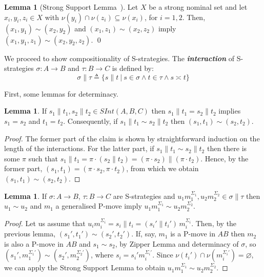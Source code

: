\documentclass{CSML}
\theoremstyle{definition}\newtheorem{definition}[thm]{Definition}
\theoremstyle{definition}\newtheorem{example}[thm]{Example}
\theoremstyle{definition}\newtheorem{proposition}[thm]{Proposition}
\theoremstyle{definition}\newtheorem{lemma}[thm]{Lemma}
\theoremstyle{definition}\newtheorem{theorem}[thm]{Theorem}
\theoremstyle{definition}\newtheorem{corollary}[thm]{Corollary}
\theoremstyle{definition}\newtheorem{remark}[thm]{Remark}
\newcommand\nt[1]{#1}
\renewcommand\Sigma{\varSigma}
\newcommand\defn{\triangleq}
\newcommand\arr{\rightarrow}
\newcommand\iseq{\mathop{\|}}
\newcommand\Sinter[1]{\mathit{SInt}(#1)}
\newcommand\boldemph[1]{\emph{\textbf{#1}}}
\begin{document}
\begin{lemma}[Strong Support Lemma~\cite{Tze09}]
Let $X$ be a strong nominal set and let $x_i,y_i,z_i\in X$ with $\nu(y_i)\cap\nu(z_i)\subseteq\nu(x_i)$, for $i=1,2$.
Then, $(x_1,y_1)\sim(x_2,y_2)$ and $(x_1,z_1)\sim(x_2,z_2)$ imply $(x_1,y_1,z_1)\sim(x_2,y_2,z_2)$. \qed
\end{lemma}


We proceed to show compositionality of S-strategies. The \boldemph{interaction} of S-strategies $\sigma:A\arr B$ and $\tau:B\arr C$ is defined by:
\[ \sigma\iseq\tau\defn\{s\iseq t\ |\ s\in\sigma\land t\in\tau\land s\asymp t\} \]

First, some lemmas for determinacy.

\begin{lemma}
If $s_1\iseq t_1,s_2\iseq t_2\in\Sinter{A,B,C}$ then $s_1\iseq t_1=s_2\iseq t_2$ implies $s_1=s_2$ and $t_1=t_2$.
\nt{Consequently, if $s_1\iseq t_1\sim s_2\iseq t_2$ then $(s_1,t_1)\sim(s_2,t_2)$.}
\end{lemma}
\begin{proof}
The former part of the claim is shown by straightforward induction on the length of the interactions. For the latter part, if $s_1\iseq t_1\sim s_2\iseq t_2$ then there is some $\pi$ such that $s_1\iseq t_1=\pi\cdot( s_2\iseq t_2)=(\pi\cdot s_2)\iseq(\pi\cdot t_2)$. Hence, by the former part,  $(s_1,t_1)=(\pi\cdot s_2,\pi\cdot t_2)$, from which we obtain $(s_1,t_1)\sim(s_2,t_2)$.
\end{proof}

\begin{lemma}\label{l:det_inter}
If $\sigma:A\arr B$, $\tau:B\arr C$ are S-strategies and $u_1m_1^{\Sigma_1},u_2m_2^{\Sigma_2}\in\sigma\iseq\tau$ then $u_1\sim u_2$ and $m_1$ a generalised P-move imply $u_1m_1^{\Sigma_1}\sim u_2m_2^{\Sigma_2}$.
\end{lemma}
\begin{proof}
Let us assume that $u_im_i^{\Sigma_i}=s_i\iseq t_i=(s_i'\iseq t_i')\,m_i^{\Sigma_i}$. Then, by 
the previous lemma,
$(s_1',t_1')\sim(s_2',t_2')$. If, say, $m_1$ is a P-move in $AB$ then 
$m_2$ is also a P-move in $AB$ and
$s_1\sim s_2$, by Zipper Lemma and determinacy of $\sigma$, so $(s_1',m_1^{\Sigma_1'})\sim(s_2',m_2^{\Sigma_2'})$, where $s_i=s_i'm_i^{\Sigma_i'}$. Since $\nu(t_i')\cap\nu(m_i^{\Sigma_i'})=\varnothing$, we can apply the Strong Support Lemma to obtain $u_1m_1^{\Sigma_1}\sim u_2m_2^{\Sigma_2}$.
\end{proof}
\end{document}
